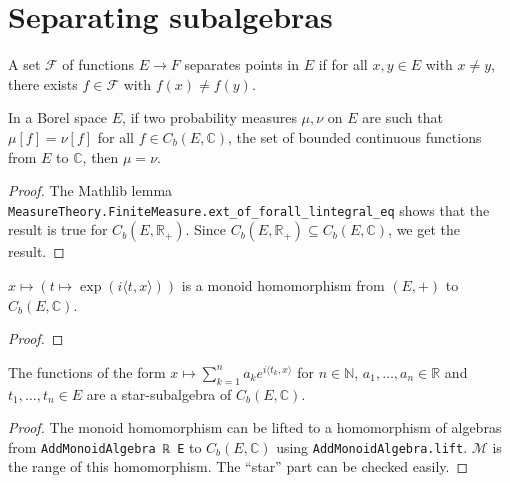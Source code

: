 \chapter{Separating subalgebras}

\begin{definition}\label{def:separates_points}
\mathlibok
{}
A set $\mathcal F$ of functions $E \to F$ separates points in $E$ if for all $x, y \in E$ with $x \ne y$, there exists $f \in \mathcal F$ with $f(x) \ne f(y)$.
\end{definition}


\begin{lemma}\label{lem:bounded_continuous_separating}
\mathlibok
{}
In a Borel space $E$, if two probability measures $\mu, \nu$ on $E$ are such that $\mu[f] = \nu[f]$ for all $f \in C_b(E, \mathbb{C})$, the set of bounded continuous functions from $E$ to $\mathbb{C}$, then $\mu = \nu$.
\end{lemma}

\begin{proof}\leanok
The Mathlib lemma \texttt{MeasureTheory.FiniteMeasure.ext\_of\_forall\_lintegral\_eq} shows that the result is true for $C_b(E, \mathbb{R}_+)$. Since $C_b(E, \mathbb{R}_{+}) \subseteq C_b(E, \mathbb{C})$, we get the result.
\end{proof}


\begin{lemma}\label{lem:exp_character}
 \leanok
$x \mapsto (t \mapsto \exp(i \langle t, x \rangle))$ is a monoid homomorphism from $(E,+)$ to $C_b(E, \mathbb{C})$.
\end{lemma}

\begin{proof}\leanok
\end{proof}


\begin{lemma}\label{lem:starSubalgebra_expPoly}
 \leanok
The functions of the form $x \mapsto \sum_{k=1}^n a_k e^{i\langle t_k, x\rangle}$ for $n \in \mathbb{N}$, $a_1, \ldots, a_n \in \mathbb{R}$ and $t_1, \ldots, t_n \in E$ are a star-subalgebra of $C_b(E, \mathbb{C})$. 
\end{lemma}

\begin{proof} \leanok
The monoid homomorphism can be lifted to a homomorphism of algebras from \texttt{AddMonoidAlgebra ℝ E} to $C_b(E, \mathbb{C})$ using \texttt{AddMonoidAlgebra.lift}. $\mathcal M$ is the range of this homomorphism. The ``star'' part can be checked easily.
\end{proof}


